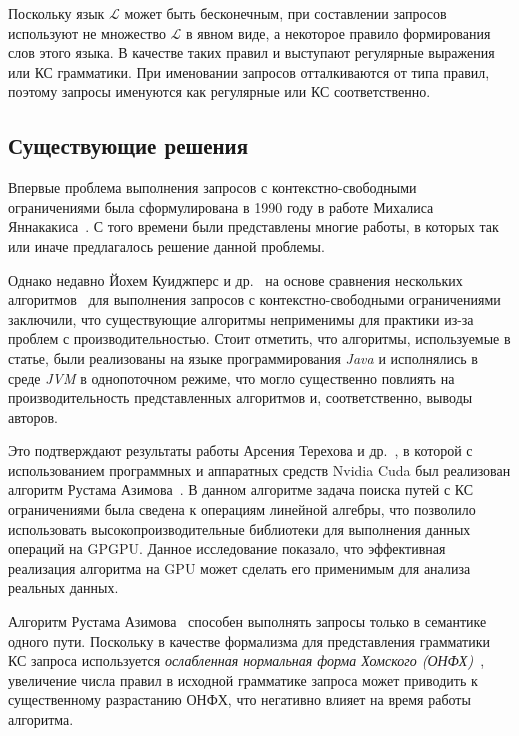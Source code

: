 Поскольку язык $\mathcal{L}$ может быть бесконечным, при составлении запросов используют не множество $\mathcal{L}$ в явном виде, а некоторое правило формирования слов этого языка. В качестве таких правил и выступают регулярные выражения или КС грамматики. При именовании запросов отталкиваются от типа правил, поэтому запросы именуются как регулярные или КС соответственно.

\subsection{Существующие решения}

Впервые проблема выполнения запросов с контекстно-свободными ограничениями была сформулирована в 1990 году в работе Михалиса Яннакакиса~\cite{inproceedings:yannakakis_cfpq_problem}. С того времени были представлены многие работы, в которых так или иначе предлагалось решение данной проблемы. 

Однако недавно  Йохем Куиджперс и др.~\cite{article:kuijpers_cfpq_exp_compare} на основе сравнения нескольких алгоритмов~\cite{article:hellings_cfpq,inproceedings:matrix_cfpq,inbook:santos_cfpq_lr_analysis} для выполнения запросов с контекстно-свободными ограничениями заключили, что существующие алгоритмы неприменимы для практики из-за проблем с производительностью.
Стоит отметить, что алгоритмы, используемые в статье, были реализованы на языке программирования \textit{Java} и исполнялись в среде \textit{JVM} в однопоточном режиме, что могло существенно повлиять на производительность представленных алгоритмов и, соответственно, выводы авторов.

Это подтверждают результаты работы Арсения Терехова и др.~\cite{inproceedings:cfqp_matrix_with_single_source}, в которой с использованием программных и аппаратных средств Nvidia Cuda был реализован алгоритм Рустама Азимова~\cite{inproceedings:matrix_cfpq}. В данном алгоритме задача поиска путей с КС ограничениями была сведена к операциям линейной алгебры, что позволило использовать высокопроизводительные библиотеки для выполнения данных операций на GPGPU. 
Данное исследование показало, что эффективная реализация алгоритма на GPU может сделать его применимым для анализа реальных данных.


Алгоритм Рустама Азимова~\cite{inproceedings:cfqp_matrix_with_single_source} способен выполнять запросы только в семантике одного пути. Поскольку в качестве формализма для представления грамматики КС запроса используется \textit{ослабленная нормальная форма Хомского (ОНФХ)}~\cite{book:automata_theory}, увеличение числа правил в исходной грамматике запроса может приводить к существенному разрастанию ОНФХ, что негативно влияет на время работы алгоритма.

